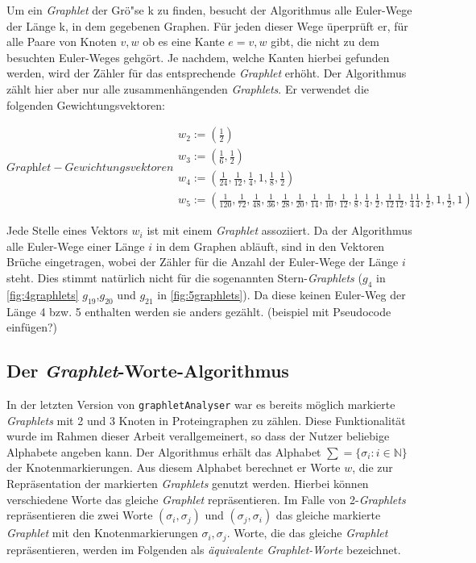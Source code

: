 \documentclass{report}
\begin{document}
Um ein \textit{Graphlet} der Gr\"o"se k zu finden, besucht der Algorithmus alle Euler-Wege der L\"ange k, in dem gegebenen Graphen. F\"ur jeden dieser Wege \"uperpr\"uft er, f\"ur alle Paare von Knoten $v,w$ ob es eine Kante $e = {v,w}$ gibt, die nicht zu dem besuchten Euler-Weges gehg\"ort. Je nachdem, welche Kanten hierbei gefunden werden, wird der Z\"ahler f\"ur das entsprechende \textit{Graphlet} erh\"oht. Der Algorithmus z\"ahlt hier aber nur alle zusammenh\"angenden \textit{Graphlets}. Er verwendet die folgenden Gewichtungsvektoren: 


\begin{subequations}
\label{eq:w-vector}
\textit{Graphlet}-Gewichtungsvektoren
\begin{align}
w_2 := \left( \frac{1}{2} \right) \\
w_3 := \left( \frac{1}{6}, \frac{1}{2} \right) \\
w_4 := \left( \frac{1}{24}, \frac{1}{12}, \frac{1}{4}, 1, \frac{1}{8},\frac{1}{2} \right) \\
w_5 := \left( \frac{1}{120}, \frac{1}{72}, \frac{1}{48}, \frac{1}{36}, \frac{1}{28}, \frac{1}{20}, \frac{1}{14}, \frac{1}{10}, \frac{1}{12}, \frac{1}{8}, \frac{1}{4}, \frac{1}{2}, \frac{1}{12} \frac{1}{12}, \frac{1}{4} \frac{1}{4}, \frac{1}{2}, 1, \frac{1}{2}, 1\right)
\end{align}
\end{subequations}

Jede Stelle eines Vektors $w_i$ ist mit einem \textit{Graphlet} assoziiert. Da der Algorithmus alle Euler-Wege einer L\"ange $i$ in dem Graphen abl\"auft, sind in den Vektoren Br\"uche eingetragen, wobei der Z\"ahler f\"ur die Anzahl der Euler-Wege der L\"ange $i$ steht. Dies stimmt nat\"urlich nicht f\"ur die sogenannten Stern-\textit{Graphlets} ($g_4$ in \ref{fig:4graphlets} $g_{19}$,$g_{20}$ und $g_{21}$ in \ref{fig:5graphlets}). Da diese keinen Euler-Weg der L\"ange 4 bzw. 5 enthalten werden sie anders gez\"ahlt.
(beispiel mit Pseudocode einf\"ugen?)

\subsection{Der \textit{Graphlet}-Worte-Algorithmus}

In der letzten Version von \texttt{graphletAnalyser} war es bereits m\"oglich markierte \textit{Graphlets} mit 2 und 3 Knoten in Proteingraphen zu z\"ahlen. Diese Funktionalit\"at wurde im Rahmen dieser Arbeit verallgemeinert, so dass der Nutzer beliebige Alphabete angeben kann.
Der Algorithmus erh\"alt das Alphabet $\sum = \{ \sigma_i : i \in \mathbb{N} \}$ der Knotenmarkierungen. Aus diesem Alphabet berechnet er Worte $w$, die zur Repr\"asentation der markierten \textit{Graphlets} genutzt werden.
Hierbei k\"onnen verschiedene Worte das gleiche \textit{Graphlet} repr\"asentieren. Im Falle von 2-\textit{Graphlets} repr\"asentieren die zwei Worte $(\sigma_i,\sigma_j)$ und $(\sigma_j, \sigma_i)$ das gleiche markierte \textit{Graphlet} mit den Knotenmarkierungen $\sigma_i,\sigma_j$. Worte, die das gleiche \textit{Graphlet} repr\"asentieren, werden im Folgenden als \emph{\"aquivalente Graphlet-Worte}  bezeichnet.
\end{document}
